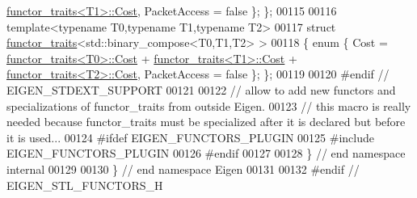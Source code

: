 \begin{DoxyCode}
      \hyperlink{struct_eigen_1_1internal_1_1functor__traits}{functor\_traits<T1>::Cost}, PacketAccess = \textcolor{keyword}{false} \}; \};
00115 
00116 \textcolor{keyword}{template}<\textcolor{keyword}{typename} T0,\textcolor{keyword}{typename} T1,\textcolor{keyword}{typename} T2>
00117 \textcolor{keyword}{struct }\hyperlink{struct_eigen_1_1internal_1_1functor__traits}{functor\_traits}<std::binary\_compose<T0,T1,T2> >
00118 \{ \textcolor{keyword}{enum} \{ Cost = \hyperlink{struct_eigen_1_1internal_1_1functor__traits}{functor\_traits<T0>::Cost} + 
      \hyperlink{struct_eigen_1_1internal_1_1functor__traits}{functor\_traits<T1>::Cost} + \hyperlink{struct_eigen_1_1internal_1_1functor__traits}{functor\_traits<T2>::Cost}, 
      PacketAccess = \textcolor{keyword}{false} \}; \};
00119 
00120 \textcolor{preprocessor}{#endif // EIGEN\_STDEXT\_SUPPORT}
00121 
00122 \textcolor{comment}{// allow to add new functors and specializations of functor\_traits from outside Eigen.}
00123 \textcolor{comment}{// this macro is really needed because functor\_traits must be specialized after it is declared but before
       it is used...}
00124 \textcolor{preprocessor}{#ifdef EIGEN\_FUNCTORS\_PLUGIN}
00125 \textcolor{preprocessor}{#include EIGEN\_FUNCTORS\_PLUGIN}
00126 \textcolor{preprocessor}{#endif}
00127 
00128 \} \textcolor{comment}{// end namespace internal}
00129 
00130 \} \textcolor{comment}{// end namespace Eigen}
00131 
00132 \textcolor{preprocessor}{#endif // EIGEN\_STL\_FUNCTORS\_H}
\end{DoxyCode}
